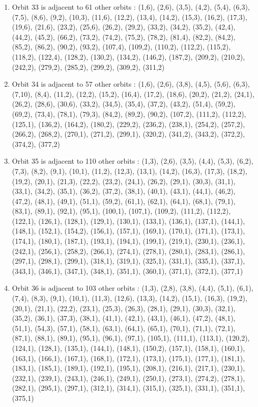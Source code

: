 \documentclass[12pt]{article}
\begin{document}
\begin{enumerate}
\item Orbit 33 is adjacent to 61 other orbits : (1,6), (2,6), (3,5), (4,2), (5,4), (6,3), (7,5), (8,6), (9,2), (10,3), (11,6), (12,2), (13,4), (14,2), (15,3), (16,2), (17,3), (19,6), (21,6), (23,2), (25,6), (26,2), (29,2), (33,2), (34,2), (35,2), (42,4), (44,2), (45,2), (66,2), (73,2), (74,2), (75,2), (78,2), (81,4), (82,2), (84,2), (85,2), (86,2), (90,2), (93,2), (107,4), (109,2), (110,2), (112,2), (115,2), (118,2), (122,4), (128,2), (130,2), (134,2), (146,2), (187,2), (209,2), (210,2), (242,2), (279,2), (285,2), (299,2), (309,2), (311,2)
\item Orbit 34 is adjacent to 57 other orbits : (1,6), (2,6), (3,8), (4,5), (5,6), (6,3), (7,10), (8,4), (11,2), (12,2), (15,2), (16,4), (17,2), (18,6), (20,2), (21,2), (24,1), (26,2), (28,6), (30,6), (33,2), (34,5), (35,4), (37,2), (43,2), (51,4), (59,2), (69,2), (73,4), (78,1), (79,3), (84,2), (89,2), (90,2), (107,2), (111,2), (112,2), (125,1), (136,2), (164,2), (180,2), (229,2), (236,2), (238,1), (254,2), (257,2), (266,2), (268,2), (270,1), (271,2), (299,1), (320,2), (341,2), (343,2), (372,2), (374,2), (377,2)
\item Orbit 35 is adjacent to 110 other orbits : (1,3), (2,6), (3,5), (4,4), (5,3), (6,2), (7,3), (8,2), (9,1), (10,1), (11,2), (12,3), (13,1), (14,2), (16,3), (17,3), (18,2), (19,2), (20,1), (21,3), (22,2), (23,2), (24,1), (26,2), (29,1), (30,3), (31,1), (33,1), (34,2), (35,1), (36,2), (37,2), (38,1), (40,1), (43,1), (44,1), (46,2), (47,2), (48,1), (49,1), (51,1), (59,2), (61,1), (62,1), (64,1), (68,1), (79,1), (83,1), (89,1), (92,1), (95,1), (100,1), (107,1), (109,2), (111,2), (112,2), (122,1), (126,1), (128,1), (129,1), (130,1), (133,1), (136,1), (137,1), (144,1), (148,1), (152,1), (154,2), (156,1), (157,1), (169,1), (170,1), (171,1), (173,1), (174,1), (180,1), (187,1), (193,1), (194,1), (199,1), (219,1), (230,1), (236,1), (242,1), (256,1), (258,2), (266,1), (274,1), (278,1), (280,1), (283,1), (286,1), (297,1), (298,1), (299,1), (318,1), (319,1), (325,1), (331,1), (335,1), (337,1), (343,1), (346,1), (347,1), (348,1), (351,1), (360,1), (371,1), (372,1), (377,1)
\item Orbit 36 is adjacent to 103 other orbits : (1,3), (2,8), (3,8), (4,4), (5,1), (6,1), (7,4), (8,3), (9,1), (10,1), (11,3), (12,6), (13,3), (14,2), (15,1), (16,3), (19,2), (20,1), (21,1), (22,2), (23,1), (25,3), (26,3), (28,1), (29,1), (30,3), (32,1), (35,2), (36,1), (37,3), (38,1), (41,1), (42,1), (43,1), (46,1), (47,2), (48,1), (51,1), (54,3), (57,1), (58,1), (63,1), (64,1), (65,1), (70,1), (71,1), (72,1), (87,1), (88,1), (89,1), (95,1), (96,1), (97,1), (105,1), (111,1), (113,1), (120,2), (124,1), (128,1), (135,1), (144,1), (148,1), (150,2), (157,1), (158,1), (160,1), (163,1), (166,1), (167,1), (168,1), (172,1), (173,1), (175,1), (177,1), (181,1), (183,1), (185,1), (189,1), (192,1), (195,1), (208,1), (216,1), (217,1), (230,1), (232,1), (239,1), (243,1), (246,1), (249,1), (250,1), (273,1), (274,2), (278,1), (282,1), (295,1), (297,1), (312,1), (314,1), (315,1), (325,1), (331,1), (351,1), (375,1)

\end{enumerate}
\end{document}
